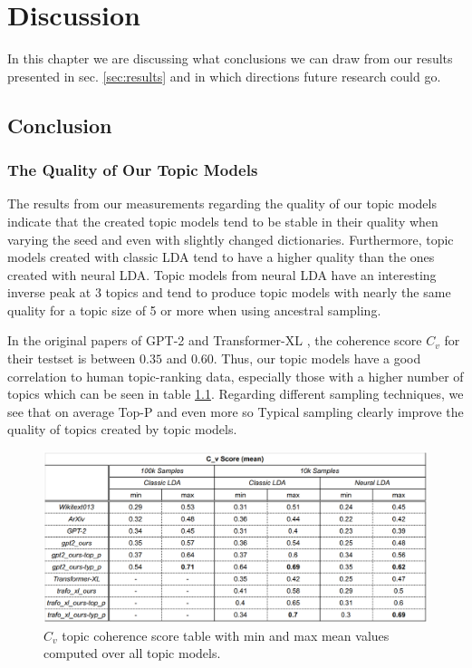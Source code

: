 \chapter{Discussion}
In this chapter we are discussing what conclusions we can draw from our results presented in sec. \ref{sec:results} and in which directions future research could go.

\section{Conclusion}
\subsection{The Quality of Our Topic Models}
The results from our measurements regarding the quality of our topic models indicate that the created topic models tend to be stable in their quality when varying the seed and even with slightly changed dictionaries. Furthermore, topic models created with classic LDA tend to have a higher quality than the ones created with neural LDA. Topic models from neural LDA have an interesting inverse peak at 3 topics and tend to produce topic models with nearly the same quality for a topic size of 5 or more when using ancestral sampling.

In the original papers of GPT-2 \cite{gpt-2} and Transformer-XL  \cite{transformer-xl}, the coherence score $C_v$ for their testset is between $0.35$ and $0.60$. Thus, our topic models have a good correlation to human topic-ranking data, especially those with a higher number of topics which can be seen in table \ref{fig:summary}. Regarding different sampling techniques, we see that on average Top-P and even more so Typical sampling clearly improve the quality of topics created by topic models.  
\begin{figure}[H]
    \centering
    \includegraphics[width=1\textwidth]{figures/Unigrams-cv-var-table-is}
    \caption{$C_v$ topic coherence score table with min and max mean values computed over all topic models.}
\label{fig:summary}
\end{figure}

